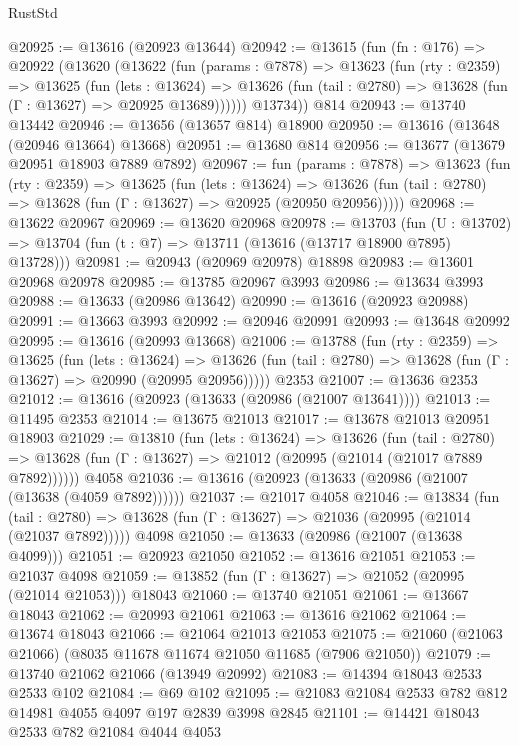 \begin{lexlean}{RustStd}
\begin{coremodule}
@20925 := @13616 (@20923 @13644)
@20942 := @13615
    (fun (fn : @176) =>
    @20922
      (@13620
        (@13622
          (fun (params : @7878) =>
          @13623
            (fun (rty : @2359) =>
            @13625
              (fun (lets : @13624) =>
              @13626 (fun (tail : @2780) => @13628 (fun (Γ : @13627) => @20925 @13689))))))
        @13734))
    @814
@20943 := @13740 @13442
@20946 := @13656 (@13657 @814) @18900
@20950 := @13616 (@13648 (@20946 @13664) @13668)
@20951 := @13680 @814
@20956 := @13677 (@13679 @20951 @18903 @7889 @7892)
@20967 := fun (params : @7878) =>
  @13623
    (fun (rty : @2359) =>
    @13625
      (fun (lets : @13624) =>
      @13626 (fun (tail : @2780) => @13628 (fun (Γ : @13627) => @20925 (@20950 @20956)))))
@20968 := @13622 @20967
@20969 := @13620 @20968
@20978 := @13703
    (fun (U : @13702) => @13704 (fun (t : @7) => @13711 (@13616 (@13717 @18900 @7895) @13728)))
@20981 := @20943 (@20969 @20978) @18898
@20983 := @13601 @20968 @20978
@20985 := @13785 @20967 @3993
@20986 := @13634 @3993
@20988 := @13633 (@20986 @13642)
@20990 := @13616 (@20923 @20988)
@20991 := @13663 @3993
@20992 := @20946 @20991
@20993 := @13648 @20992
@20995 := @13616 (@20993 @13668)
@21006 := @13788
    (fun (rty : @2359) =>
    @13625
      (fun (lets : @13624) =>
      @13626 (fun (tail : @2780) => @13628 (fun (Γ : @13627) => @20990 (@20995 @20956)))))
    @2353
@21007 := @13636 @2353
@21012 := @13616 (@20923 (@13633 (@20986 (@21007 @13641))))
@21013 := @11495 @2353
@21014 := @13675 @21013
@21017 := @13678 @21013 @20951 @18903
@21029 := @13810
    (fun (lets : @13624) =>
    @13626
      (fun (tail : @2780) =>
      @13628 (fun (Γ : @13627) => @21012 (@20995 (@21014 (@21017 @7889 @7892))))))
    @4058
@21036 := @13616 (@20923 (@13633 (@20986 (@21007 (@13638 (@4059 @7892))))))
@21037 := @21017 @4058
@21046 := @13834
    (fun (tail : @2780) => @13628 (fun (Γ : @13627) => @21036 (@20995 (@21014 (@21037 @7892)))))
    @4098
@21050 := @13633 (@20986 (@21007 (@13638 @4099)))
@21051 := @20923 @21050
@21052 := @13616 @21051
@21053 := @21037 @4098
@21059 := @13852 (fun (Γ : @13627) => @21052 (@20995 (@21014 @21053))) @18043
@21060 := @13740 @21051
@21061 := @13667 @18043
@21062 := @20993 @21061
@21063 := @13616 @21062
@21064 := @13674 @18043
@21066 := @21064 @21013 @21053
@21075 := @21060 (@21063 @21066) (@8035 @11678 @11674 @21050 @11685 (@7906 @21050))
@21079 := @13740 @21062 @21066 (@13949 @20992)
@21083 := @14394 @18043 @2533 @2533 @102
@21084 := @69 @102
@21095 := @21083 @21084 @2533 @782 @812 @14981 @4055 @4097 @197 @2839 @3998 @2845
@21101 := @14421 @18043 @2533 @782 @21084 @4044 @4053

\end{coremodule}
\end{lexlean}
